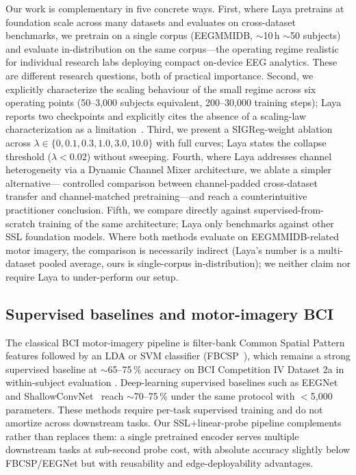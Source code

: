 Our work is complementary in five concrete ways. First, where Laya pretrains
at foundation scale across many datasets and evaluates on cross-dataset
benchmarks, we pretrain on a single corpus (EEGMMIDB, $\sim$10\,h
$\sim$50 subjects) and evaluate in-distribution on the same corpus---the
operating regime realistic for individual research labs deploying compact
on-device EEG analytics. These are different research questions, both of
practical importance. Second, we explicitly characterize the scaling
behaviour of the small regime across six operating points (50--3{,}000
subjects equivalent, 200--30{,}000 training steps); Laya reports two
checkpoints and explicitly cites the absence of a scaling-law
characterization as a limitation~\cite[Sec.~5]{laya2026}. Third, we present
a SIGReg-weight ablation across $\lambda\in\{0, 0.1, 0.3, 1.0, 3.0, 10.0\}$
with full curves; Laya states the collapse threshold ($\lambda<0.02$)
without sweeping. Fourth, where Laya addresses channel heterogeneity via a
Dynamic Channel Mixer architecture, we ablate a simpler alternative---
controlled comparison between channel-padded cross-dataset transfer and
channel-matched pretraining---and reach a counterintuitive practitioner
conclusion. Fifth, we compare directly against supervised-from-scratch
training of the same architecture; Laya only benchmarks against other SSL
foundation models. Where both methods evaluate on EEGMMIDB-related motor
imagery, the comparison is necessarily indirect (Laya's number is a
multi-dataset pooled average, ours is single-corpus in-distribution); we
neither claim nor require Laya to under-perform our setup.

\subsection{Supervised baselines and motor-imagery BCI}

The classical BCI motor-imagery pipeline is filter-bank Common Spatial
Pattern features followed by an LDA or SVM classifier (FBCSP~\cite{fbcsp2008}),
which remains a strong supervised baseline at $\sim$65--75\,\% accuracy on
BCI Competition IV Dataset 2a in within-subject evaluation
\cite{eegnet2018,deepconv2017}. Deep-learning supervised baselines such as
EEGNet~\cite{eegnet2018} and ShallowConvNet~\cite{deepconv2017} reach
$\sim$70--75\,\% under the same protocol with $<$5{,}000 parameters. These
methods require per-task supervised training and do not amortize across
downstream tasks. Our SSL$+$linear-probe pipeline complements rather than
replaces them: a single pretrained encoder serves multiple downstream tasks
at sub-second probe cost, with absolute accuracy slightly below FBCSP/EEGNet
but with reusability and edge-deployability advantages.

